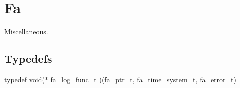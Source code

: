 \hypertarget{group___fa_fa}{\section{Fa}
\label{group___fa_fa}
}


Miscellaneous.  


\subsection*{Typedefs}
\begin{DoxyCompactItemize}
\item 
typedef void($\ast$ \hyperlink{group___fa_fa_ga1f914d0c16f566e96a08db3a3446aab7}{fa\-\_\-log\-\_\-func\-\_\-t} )(\hyperlink{group___fa_ga915ddeae99ad7568b273d2b876425197}{fa\-\_\-ptr\-\_\-t}, \hyperlink{group___fa_time_ga7dd7e28574eec80380aac22be7087d2e}{fa\-\_\-time\-\_\-system\-\_\-t}, \hyperlink{group___fa_error_ga4a4feb4d3686657ac8dbd2be421cbb15}{fa\-\_\-error\-\_\-t})
\end{DoxyCompactItemize}
